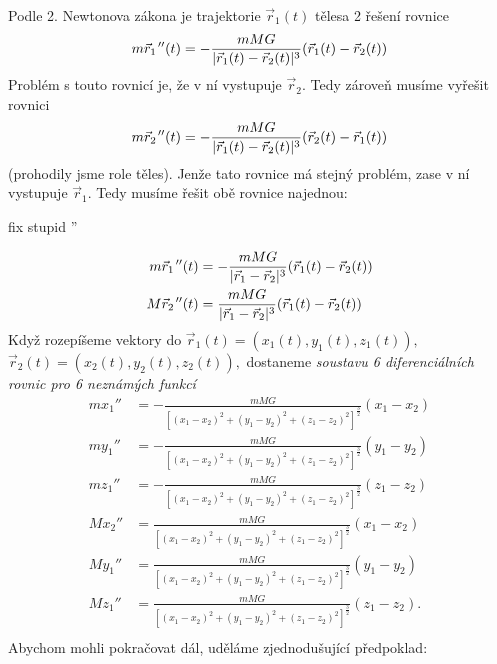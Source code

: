 Podle 2. Newtonova zákona je trajektorie $\vec{r}_1(t)$ tělesa 2 řešení rovnice
\begin{equation*}
	m\vec{r}_1\hspace{.1em}''(t) = -\frac{mMG}{|\vec{r}_1(t)-\vec{r}_2(t)|^3}(\vec{r}_1(t)-\vec{r}_2(t))
\end{equation*}
Problém s touto rovnicí je, že v ní vystupuje $\vec{r}_2$. Tedy zároveň musíme vyřešit rovnici
\begin{equation*}
	m\vec{r}_2\hspace{.1em}''(t) = -\frac{mMG}{|\vec{r}_1(t)-\vec{r}_2(t)|^3}(\vec{r}_2(t)-\vec{r}_1(t))
\end{equation*}
(prohodily jsme role těles). Jenže tato rovnice má stejný problém, zase v ní vystupuje $\vec{r}_1$. Tedy musíme řešit obě rovnice najednou:
\begin{Todo}
  fix stupid ''
\end{Todo}
\begin{align*}
	m\vec{r}_1\hspace{.1em}''(t) &= -\frac{mMG}{|\vec{r}_1-\vec{r}_2|^3}(\vec{r}_1(t)-\vec{r}_2(t)) \\
	M\vec{r}_2\hspace{.1em}''(t) &= \frac{mMG}{|\vec{r}_1-\vec{r}_2|^3}(\vec{r}_1(t)-\vec{r}_2(t))
\end{align*}
Když rozepíšeme vektory do $\vec{r}_1(t)=(x_1(t),y_1(t),z_1(t)),$ $\vec{r}_2(t)=(x_2(t),y_2(t),z_2(t)),$ dostaneme \emph{soustavu 6 diferenciálních rovnic pro 6 neznámých funkcí}
\begin{align*}
	mx_1'' &= -\frac{mMG}{[(x_1-x_2)^{2}+(y_1-y_2)^{2}+(z_1-z_2)^{2}]^{\frac{3}{2}}}(x_1-x_2) \\
	my_1'' &= -\frac{mMG}{[(x_1-x_2)^{2}+(y_1-y_2)^{2}+(z_1-z_2)^{2}]^{\frac{3}{2}}}(y_1-y_2) \\
	mz_1'' &= -\frac{mMG}{[(x_1-x_2)^{2}+(y_1-y_2)^{2}+(z_1-z_2)^{2}]^{\frac{3}{2}}}(z_1-z_2) \\
	Mx_2'' &= \frac{mMG}{[(x_1-x_2)^{2}+(y_1-y_2)^{2}+(z_1-z_2)^{2}]^{\frac{3}{2}}}(x_1-x_2) \\
	My_1'' &= \frac{mMG}{[(x_1-x_2)^{2}+(y_1-y_2)^{2}+(z_1-z_2)^{2}]^{\frac{3}{2}}}(y_1-y_2) \\
	Mz_1'' &= \frac{mMG}{[(x_1-x_2)^{2}+(y_1-y_2)^{2}+(z_1-z_2)^{2}]^{\frac{3}{2}}}(z_1-z_2). \\
\end{align*}
Abychom mohli pokračovat dál, uděláme zjednodušující předpoklad:
\begin{center}
\end{center}
